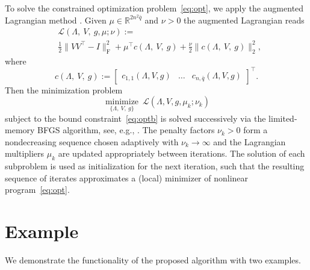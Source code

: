 \documentclass[11pt]{article}
\newcommand{\R}{\mathbb{R}}
\theoremstyle{plain}
\theoremstyle{definition}
\theoremstyle{remark}
\begin{document}
To solve the constrained optimization problem~\eqref{eq:opt}, we apply the augmented Lagrangian method \cite{nocedal2006numerical}. Given $\mu\in\R^{2n^2\bar q}$ and $\nu>0$ the augmented Lagrangian reads
\begin{equation*}
\begin{split}
    &\mathcal L(\Lambda,\ V,\ g,\mu;\nu):=\\
    &\frac{1}{2}\lVert VV^\top -I\rVert_\mathrm{F}^2 + \mu^\top c(\Lambda,\ V,\ g) + \frac{\nu}{2} \lVert c(\Lambda,\ V,\ g)\rVert_2^2,
\end{split}
\end{equation*}
where
\begin{equation}
    c(\Lambda,\ V,\ g) := \begin{bmatrix}
        c_{1,1}(\Lambda,V, g)&
        \ldots &
        c_{n,\bar q}(\Lambda, V, g)
    \end{bmatrix}^\top.
\end{equation}
Then the minimization problem
\begin{equation}
    \operatorname*{minimize}_{\{\Lambda,\ V,\ g\}}\ \mathcal L(\Lambda,V,g,\mu_k;\nu_k)
\end{equation}
subject to the bound constraint~\eqref{eq:optb} is solved successively via the limited-memory BFGS algorithm, see, e.g., \cite{nocedal2006numerical}. The penalty factors $\nu_k>0$ form a nondecreasing sequence chosen adaptively with $\nu_k\rightarrow\infty$ and the Lagrangian multipliers $\mu_k$ are updated appropriately between iterations. The solution of each subproblem is used as initialization for the next iteration, such that the resulting sequence of iterates approximates a (local) minimizer of nonlinear program~\eqref{eq:opt}.

\section{Example}
\label{sec:example}
We demonstrate the functionality of the proposed algorithm with two examples.
\end{document}
